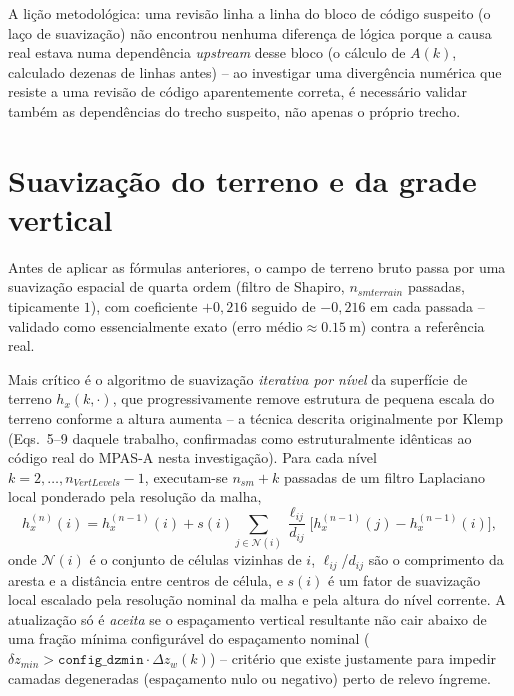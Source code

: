 \begin{caixaachado}
A lição metodológica: uma revisão linha a linha do bloco de código
suspeito (o laço de suavização) não encontrou nenhuma diferença de
lógica porque a causa real estava numa dependência \emph{upstream} desse
bloco (o cálculo de $A(k)$, calculado dezenas de linhas antes) -- ao
investigar uma divergência numérica que resiste a uma revisão de código
aparentemente correta, é necessário validar também as dependências do
trecho suspeito, não apenas o próprio trecho.
\end{caixaachado}

\section{Suavização do terreno e da grade vertical}
\label{sec:suavizacao}

Antes de aplicar as fórmulas anteriores, o campo de terreno bruto passa
por uma suavização espacial de quarta ordem (filtro de Shapiro,
$n_{smterrain}$ passadas, tipicamente $1$), com coeficiente $+0{,}216$
seguido de $-0{,}216$ em cada passada -- validado como essencialmente
exato ($\text{erro médio}\approx\SI{0,15}{\metre}$) contra a referência
real.

Mais crítico é o algoritmo de suavização \emph{iterativa por nível} da
superfície de terreno $h_x(k,\cdot)$, que progressivamente remove
estrutura de pequena escala do terreno conforme a altura aumenta -- a
técnica descrita originalmente por Klemp
\cite{klemp2011terrainfollowing} (Eqs.~5--9 daquele trabalho, confirmadas
como estruturalmente idênticas ao código real do MPAS-A nesta
investigação). Para cada nível $k=2,\dots,n_{VertLevels}-1$, executam-se
$n_{sm}+k$ passadas de um filtro Laplaciano local ponderado pela
resolução da malha,
\begin{equation}
  h_x^{(n)}(i) = h_x^{(n-1)}(i) + s(i)\!\!\sum_{j \in \mathcal{N}(i)}\!\! \frac{\ell_{ij}}{d_{ij}}\Big[h_x^{(n-1)}(j) - h_x^{(n-1)}(i)\Big],
  \label{eq:suavizacao_hx}
\end{equation}
onde $\mathcal{N}(i)$ é o conjunto de células vizinhas de $i$,
$\ell_{ij}$/$d_{ij}$ são o comprimento da aresta e a distância entre
centros de célula, e $s(i)$ é um fator de suavização local escalado pela
resolução nominal da malha e pela altura do nível corrente. A atualização
só é \emph{aceita} se o espaçamento vertical resultante não cair abaixo
de uma fração mínima configurável do espaçamento nominal
($\delta z_{min} > \texttt{config\_dzmin} \cdot \Delta z_w(k)$) --
critério que existe justamente para impedir camadas degeneradas
(espaçamento nulo ou negativo) perto de relevo íngreme.

